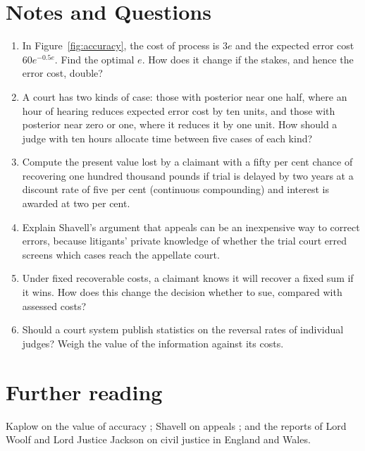 \section*{Notes and Questions}
\begin{enumerate}[label=\arabic*.]
\item In Figure~\ref{fig:accuracy}, the cost of process is $3e$ and the expected error cost $60e^{-0.5e}$. Find the optimal $e$. How does it change if the stakes, and hence the error cost, double?
\item A court has two kinds of case: those with posterior near one half, where an hour of hearing reduces expected error cost by ten units, and those with posterior near zero or one, where it reduces it by one unit. How should a judge with ten hours allocate time between five cases of each kind?
\item Compute the present value lost by a claimant with a fifty per cent chance of recovering one hundred thousand pounds if trial is delayed by two years at a discount rate of five per cent (continuous compounding) and interest is awarded at two per cent.
\item Explain Shavell's argument that appeals can be an inexpensive way to correct errors, because litigants' private knowledge of whether the trial court erred screens which cases reach the appellate court.
\item Under fixed recoverable costs, a claimant knows it will recover a fixed sum if it wins. How does this change the decision whether to sue, compared with assessed costs?
\item Should a court system publish statistics on the reversal rates of individual judges? Weigh the value of the information against its costs.
\end{enumerate}

\section*{Further reading}
Kaplow on the value of accuracy \citep{kaplow1994}; Shavell on appeals \citep{shavell1995}; and the reports of Lord Woolf and Lord Justice Jackson on civil justice in England and Wales.
